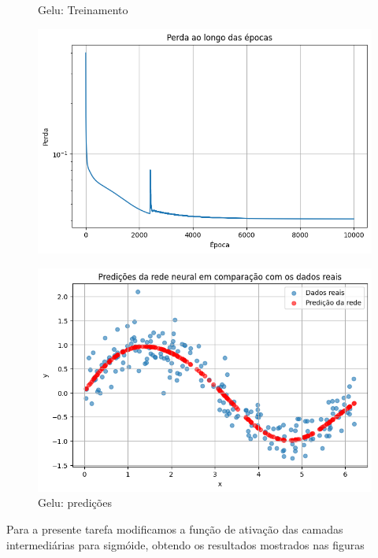 \begin{figure}[htb]
	\label{teste}
	\centering
	\begin{minipage}{0.45\textwidth}
	\centering
	\caption{Gelu: Treinamento} \label{tarefa01:gelu:treinamento}
	\includegraphics[width=\textwidth]{./0803_imgs/png-241111-212601400-7995113924505873963.png}
	\end{minipage}
	\hfill
	\begin{minipage}{0.45\textwidth}
	\centering
	\caption{Gelu: predições} \label{tarefa01:gelu:predicoes}
	\includegraphics[width=\textwidth]{./0803_imgs/png-241111-212606975-12044568718402292765.png}
	\end{minipage}
\end{figure}

Para a presente tarefa modificamos a função de ativação das camadas intermediárias para sigmóide, obtendo os resultados mostrados nas figuras


